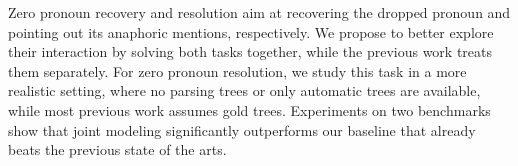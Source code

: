 Zero pronoun recovery and resolution aim at recovering the dropped pronoun and pointing out its anaphoric mentions, respectively. We propose to better explore their interaction by solving both tasks together, while the previous work treats them separately. For zero pronoun resolution, we study this task in a more realistic setting, where no parsing trees or only automatic trees are available, while most previous work assumes gold trees. Experiments on two benchmarks show that joint modeling significantly outperforms our baseline that already beats the previous state of the arts.
